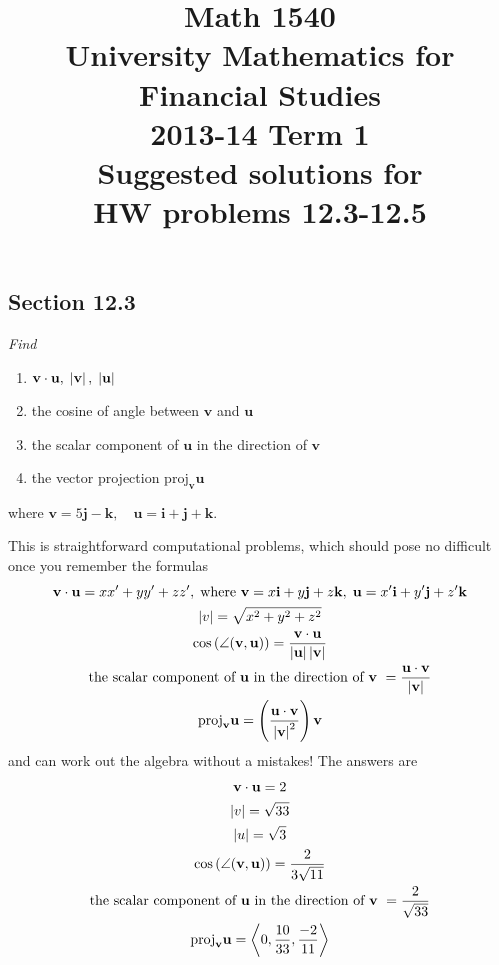 \documentclass[8pt]{article} %
\title{Math 1540\\University Mathematics for Financial Studies\\2013-14 Term 1\\Suggested solutions for\\HW problems 12.3-12.5}
\begin{document}
\maketitle
	\renewcommand{\v}{\mathbf{v}}
	\renewcommand{\u}{\mathbf{u}}
	\renewcommand{\i}{\mathbf{i}}
	\renewcommand{\j}{\mathbf{j}}
	\renewcommand{\k}{\mathbf{k}}
	\newcommand{\myproj}{\mbox{proj}_{\v}{\u}}
\begin{description}
\section{Section 12.3}
\item[\# 5.]{
	{\it 
	Find
		\begin{enumerate}[label=\bfseries\alph*.]
			\item{$\mathbf{v}\cdot \mathbf{u},\;\myabs{\v},\;\myabs{\u}$}
			\item{the cosine of angle between $\v$ and $\u$}
			\item{the scalar component of $\u$ in the direction of $\v$}
			\item{the vector projection $\mbox{proj}_{\v}{\u}$}
		\end{enumerate}
		where $\v=5\j -\k,\quad \u=\i+\j+\k$.}
	This is straightforward computational problems, which should pose no difficult once you remember the formulas
	\begin{gather*}
		\v\cdot\u=xx'+yy'+zz',\;\mbox{where }\v=x\i+y\j+z\k,\;\u=x'\i+y'\j+z'\k\\
		\myabs{v}=\sqrt{x^2+y^2+z^2}\\
		\cos\left(\angle(\v,\u)\right)=\frac{\v\cdot\u}{\myabs{\u}\myabs{\v}}\\
		\mbox{the scalar component of $\u$ in the direction of $\v$ }=\frac{\u\cdot\v}{\myabs{\v}}\\
		\mbox{proj}_{\v}{\u}=\left(\frac{\u\cdot\v}{\myabs{\v}^2}\right)\v
	\end{gather*}
	and can work out the algebra without a mistakes! The answers are
	\begin{gather*}
		\v\cdot\u=2\\
		\myabs{v}=\sqrt{33}\\
		\myabs{u}=\sqrt{3}\\
		\cos\left(\angle(\v,\u)\right)=\frac{2}{3\sqrt{11}}\\
		\mbox{the scalar component of $\u$ in the direction of $\v$ }=\frac{2}{\sqrt{33}}\\
		\mbox{proj}_{\v}{\u}=\left<0,\frac{10}{33},\frac{-2}{11}\right>

\end{gather*}}
\end{description}
\end{document}
